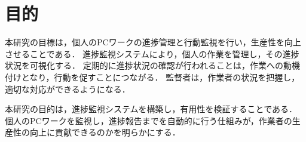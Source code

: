 \section{目的}
本研究の目標は，個人のPCワークの進捗管理と行動監視を行い，生産性を向上させることである．
進捗監視システムにより，個人の作業を管理し，その進捗状況を可視化する．
定期的に進捗状況の確認が行われることは，作業への動機付けとなり，行動を促すことにつながる．
監督者は，作業者の状況を把握し，適切な対応ができるようになる．

本研究の目的は，進捗監視システムを構築し，有用性を検証することである．
個人のPCワークを監視し，進捗報告までを自動的に行う仕組みが，作業者の生産性の向上に貢献できるのかを明らかにする．
